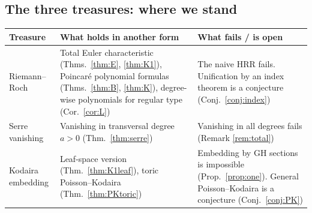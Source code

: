\subsection{The three treasures: where we stand}
\begin{center}\small
\begin{tabular}{>{\raggedright\arraybackslash}p{2.4cm}>{\raggedright\arraybackslash}p{6.5cm}>{\raggedright\arraybackslash}p{6.0cm}}
\toprule Treasure & What holds in another form & What fails / is open\\\midrule
Riemann--Roch & Total Euler characteristic (Thms.\ \ref{thm:E}, \ref{thm:K1}), Poincar\'e polynomial formulas (Thms.\ \ref{thm:B}, \ref{thm:K}), degree-wise polynomials for regular type (Cor.\ \ref{cor:L}) & The naive HRR fails. Unification by an index theorem is a conjecture (Conj.\ \ref{conj:index})\\\midrule
Serre vanishing & Vanishing in transversal degree $a>0$ (Thm.\ \ref{thm:serre}) & Vanishing in all degrees fails (Remark \ref{rem:total})\\\midrule
Kodaira embedding & Leaf-space version (Thm.\ \ref{thm:K1leaf}), toric Poisson--Kodaira (Thm.\ \ref{thm:PKtoric}) & Embedding by GH sections is impossible (Prop.\ \ref{prop:one}). General Poisson--Kodaira is a conjecture (Conj.\ \ref{conj:PK})\\\bottomrule
\end{tabular}
\end{center}

